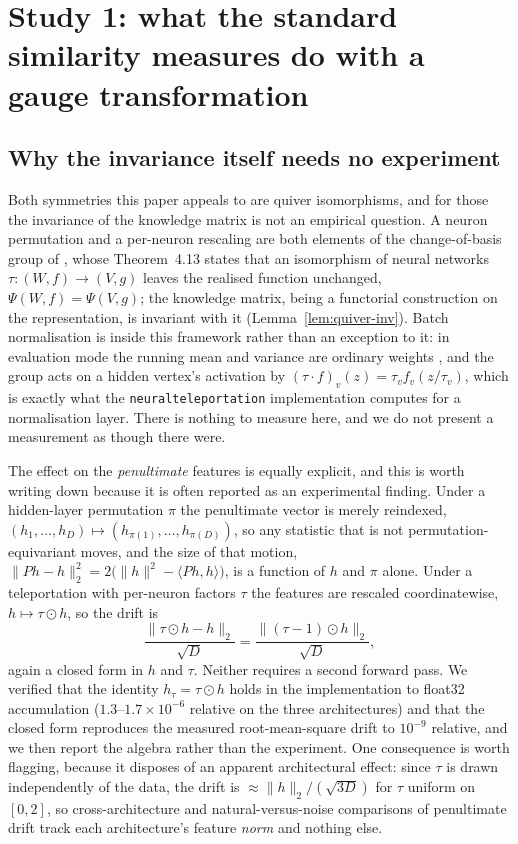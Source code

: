 \section{Study 1: what the standard similarity measures do with a gauge transformation}
\label{sec:study1}

\subsection{Why the invariance itself needs no experiment}
\label{sec:study1-analytic}

Both symmetries this paper appeals to are quiver isomorphisms, and for those the
invariance of the knowledge matrix is not an empirical question. A neuron
permutation and a per-neuron rescaling are both elements of the change-of-basis
group of \citet{armenta2021representation}, whose Theorem~4.13 states that an
isomorphism of neural networks $\tau:(W,f)\to(V,g)$ leaves the realised function
unchanged, $\Psi(W,f)=\Psi(V,g)$; the knowledge matrix, being a functorial
construction on the representation, is invariant with it
(Lemma~\ref{lem:quiver-inv}). Batch normalisation is inside this framework rather
than an exception to it: in evaluation mode the running mean and variance are
ordinary weights \citep[Remark~5.4]{armenta2021representation}, and the group acts
on a hidden vertex's activation by $(\tau\cdot f)_v(z)=\tau_v f_v(z/\tau_v)$, which
is exactly what the \texttt{neuralteleportation} implementation computes for a
normalisation layer. There is nothing to measure here, and we do not present a
measurement as though there were.

The effect on the \emph{penultimate} features is equally explicit, and this is
worth writing down because it is often reported as an experimental finding. Under
a hidden-layer permutation $\pi$ the penultimate vector is merely reindexed,
$(h_1,\dots,h_D)\mapsto(h_{\pi(1)},\dots,h_{\pi(D)})$, so any statistic that is
not permutation-equivariant moves, and the size of that motion,
$\|Ph-h\|_2^2=2\bigl(\|h\|^2-\langle Ph,h\rangle\bigr)$, is a function of $h$ and
$\pi$ alone. Under a teleportation with per-neuron factors $\tau$ the features are
rescaled coordinatewise, $h\mapsto\tau\odot h$, so the drift is
\[
\frac{\|\tau\odot h-h\|_2}{\sqrt D}=\frac{\|(\tau-1)\odot h\|_2}{\sqrt D},
\]
again a closed form in $h$ and $\tau$. Neither requires a second forward pass.
We verified that the identity $h_{\tau}=\tau\odot h$ holds in the implementation
to float32 accumulation ($1.3$--$1.7\times10^{-6}$ relative on the three
architectures) and that the closed form reproduces the measured root-mean-square
drift to $10^{-9}$ relative, and we then report the algebra rather than the
experiment. One consequence is worth flagging, because it disposes of an
apparent architectural effect: since $\tau$ is drawn independently of the data,
the drift is $\approx\|h\|_2/(\sqrt{3D})$ for $\tau$ uniform on $[0,2]$, so
cross-architecture and natural-versus-noise comparisons of penultimate drift
track each architecture's feature \emph{norm} and nothing else.

